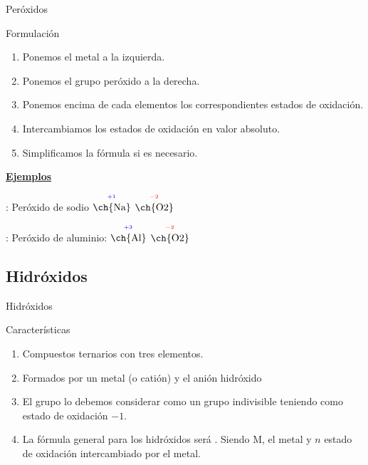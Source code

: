 \documentclass{beamer}
\newcommand{\eob}[2]{$\overset{^{\color{blue}#1}}{\text{\ch{#2}}}$}
\newcommand{\eor}[2]{$\overset{^{\color{red}#1}}{\text{\ch{#2}}}$}
\begin{document}
\begin{frame}[t]{Peróxidos}
    \begin{exampleblock}{\Large Formulación}\vspace*{5pt}
        \begin{enumerate}[label=\itembolascolor{\arabic*}{mDarkTeal}]
            \item Ponemos el metal a la izquierda.
            \item Ponemos el grupo peróxido  a la derecha.
            \item Ponemos encima de cada elementos los correspondientes estados de oxidación.
            \item Intercambiamos los estados de oxidación en valor absoluto.
            \item Simplificamos la fórmula si es necesario.
        \end{enumerate}

        \textbf{\uline{Ejemplos}}

         : Peróxido de sodio \ch{->} \eob{+1}{Na} \eor{-2}{O2}  \ch{->} 

        : Peróxido de aluminio: \ch{->} \eob{+3}{Al} \eor{-2}{O2}  \ch{->} 


    \end{exampleblock}
\end{frame}



\subsection{Hidróxidos}

\begin{frame}[t]{Hidróxidos}
    \begin{block}{\Large Características}\vspace*{5pt}
        \begin{enumerate}[label=\itembolascolor{\arabic*}{mDarkTeal}]
            \item Compuestos ternarios con tres elementos.
            \item Formados por un metal (o catión) y el anión hidróxido  
            \item El grupo   lo debemos considerar como un grupo indivisible teniendo como estado de oxidación $-1$.
            \item La fórmula general para los hidróxidos será . Siendo M, el metal y $n$ estado de oxidación intercambiado por el metal.
        \end{enumerate}
    \end{block}
\end{frame}
\end{document}
